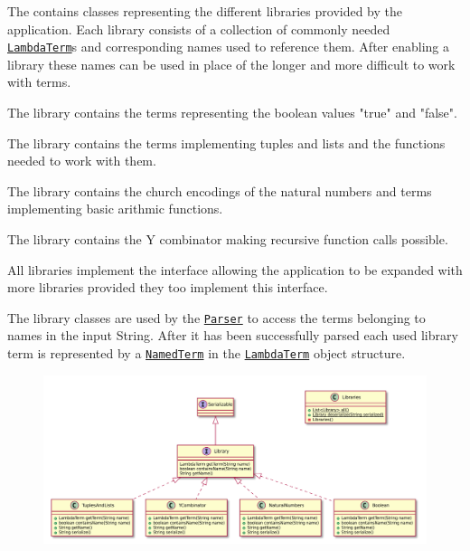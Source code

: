 The \texttt{} contains classes representing the different libraries provided by the application.
Each library consists of a collection of commonly needed \texttt{\hyperref[type:edu.kit.wavelength.client.model.term.LambdaTerm]{LambdaTerm}}s and corresponding names used to reference them.
After enabling a library  these names can be used in place of the longer and more difficult to work with terms.

The \texttt{} library contains the terms representing the boolean values "true" and "false".

The \texttt{} library contains the terms implementing tuples and lists and the functions needed to work with them.

The \texttt{} library contains the church encodings of the natural numbers and terms implementing basic arithmic functions.

The \texttt{} library contains the Y combinator making recursive function calls possible.

All libraries implement the \texttt{} interface allowing the application to be expanded with more libraries provided they too implement this interface.

The library classes are used by the \texttt{\hyperref[type:edu.kit.wavelength.client.model.term.parsing.Parser]{Parser}} 
to access the terms belonging to names in the input String. 
After it has been successfully parsed each used library term is represented by a
\texttt{\hyperref[type:edu.kit.wavelength.client.model.term.NamedTerm]{NamedTerm}} 
in the \texttt{\hyperref[type:edu.kit.wavelength.client.model.term.LambdaTerm]{LambdaTerm}} object structure.

\begin{figure}[H]
	\centering
	\includegraphics[width=\textwidth]{packageDiagrams/libraryPackage}
\end{figure}